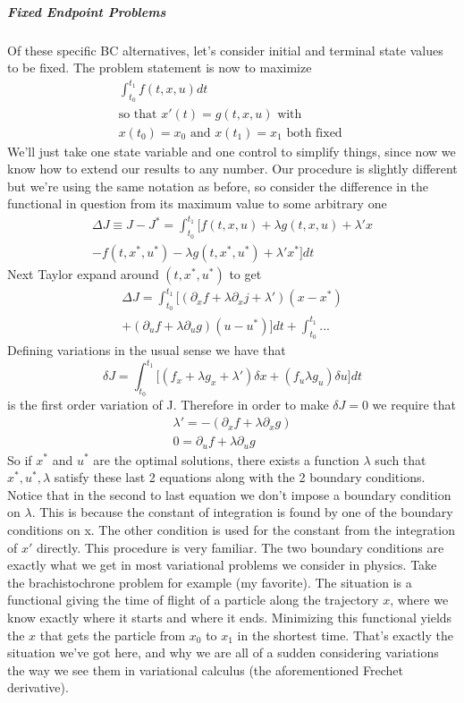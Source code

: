 \documentclass[11pt]{article}
\numberwithin{equation}{section}
\begin{document}
\subparagraph{Fixed Endpoint Problems}
Of these specific BC alternatives, let's consider initial and terminal state values to be fixed. The problem statement is now to maximize
\begin{align}
\int_{t_0}^{t_1}f(t,x,u)dt \\
\text{so that } x'(t) = g(t,x,u) \text{ with} \\
x(t_0) = x_0 \text{ and } x(t_1) = x_1 \text{ both fixed }
\end{align}
We'll just take one state variable and one control to simplify things, since now we know how to extend our results to any number. Our procedure is slightly different but we're using the same notation as before, so consider the difference in the functional in question from its maximum value to some arbitrary one
\begin{align}
\Delta J \equiv J - J^* = \int_{t_0}^{t_1}\big[f(t,x,u) + \lambda g(t,x,u) + \lambda'x \\
- f(t,x^*,u^*) - \lambda g(t,x^*,u^*) + \lambda'x^*\big]dt
\end{align}
Next Taylor expand around $(t,x^*,u^*)$ to get
\begin{align}
\Delta J = \int_{t_0}^{t_1}\big[(\partial_x f +\lambda\partial_x j + \lambda')(x - x^*) \\
+ (\partial_u f + \lambda \partial_u g)(u - u^*)\big]dt + \int_{t_0}^{t_1}...
\end{align}
Defining variations in the usual sense we have that
\begin{equation}
\delta J = \int_{t_0}^{t_1}\big[(f_x + \lambda g_x + \lambda')\delta x + (f_u \lambda g_u)\delta u\big]dt
\end{equation}
is the first order variation of J. Therefore in order to make $\delta J = 0$ we require that
\begin{align}
\lambda' = -(\partial_x f + \lambda\partial_x g) \\
0 = \partial_u f + \lambda\partial_u g
\end{align}
So if $x^*$ and $u^*$ are the optimal solutions, there exists a function $\lambda$ such that $x^*, u^*, \lambda$ satisfy these last 2 equations along with the 2 boundary conditions. Notice that in the second to last equation we don't impose a boundary condition on $\lambda$. This is because the constant of integration is found by one of the boundary conditions on x. The other condition is used for the constant from the integration of $x'$ directly.
This procedure is very familiar. The two boundary conditions are exactly what we get in most variational problems we consider in physics. Take the brachistochrone problem for example (my favorite). The situation is a functional giving the time of flight of a particle along the trajectory $x$, where we know exactly where it starts and where it ends. Minimizing this functional yields the $x$ that gets the particle from $x_0$ to $x_1$ in the shortest time. That's exactly the situation we've got here, and why we are all of a sudden considering variations the way we see them in variational calculus (the aforementioned Frechet derivative).
\end{document}

